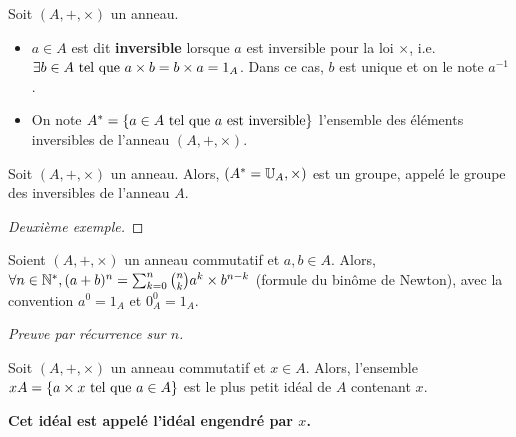 \documentclass[12pt,a4paper]{report}
\begin{document}
\begin{property}
    Soit $(A,+,\times)$ un anneau.

    \begin{itemize}
        \item $a\in A$ est dit \textbf{inversible} lorsque $a$ est inversible pour la loi $\times$, i.e. $\exists b \in A \text{ tel que } a \times b = b \times a = 1_A$. Dans ce cas, $b$ est unique et on le note $a^{-1}$.
        \item On note $A^* = \{a \in A \text{ tel que } a \text{ est inversible}\}$ l'ensemble des éléments inversibles de l'anneau $(A,+,\times)$.
    \end{itemize}
\end{property}

\begin{property}
    Soit $(A,+,\times)$ un anneau. Alors, $(A^*=\mathbb{U}_A,\times)$ est un groupe, appelé le groupe des inversibles de l'anneau $A$.
\end{property}

\begin{proof}[Deuxième exemple]
    
\end{proof}

\begin{property}
    Soient $(A,+,\times)$ un anneau commutatif et $a,b\in A$. Alors, $\forall n \in \mathbb{N}^*, (a + b)^n = \sum_{k=0}^n \binom nk a^k \times b^{n-k}$ (formule du binôme de Newton), avec la convention $a^0 = 1_A$ et $0_A^0 = 1_A$.

    \textit{Preuve par récurrence sur $n$.}
\end{property}

\begin{property}
    Soit $(A,+,\times)$ un anneau commutatif et $x \in A$. Alors, l'ensemble $xA = \{a \times x \text{ tel que } a \in A\}$ est le plus petit idéal de $A$ contenant $x$.

    \textbf{Cet idéal est appelé l'idéal engendré par $x$.}
\end{property}
\end{document}
